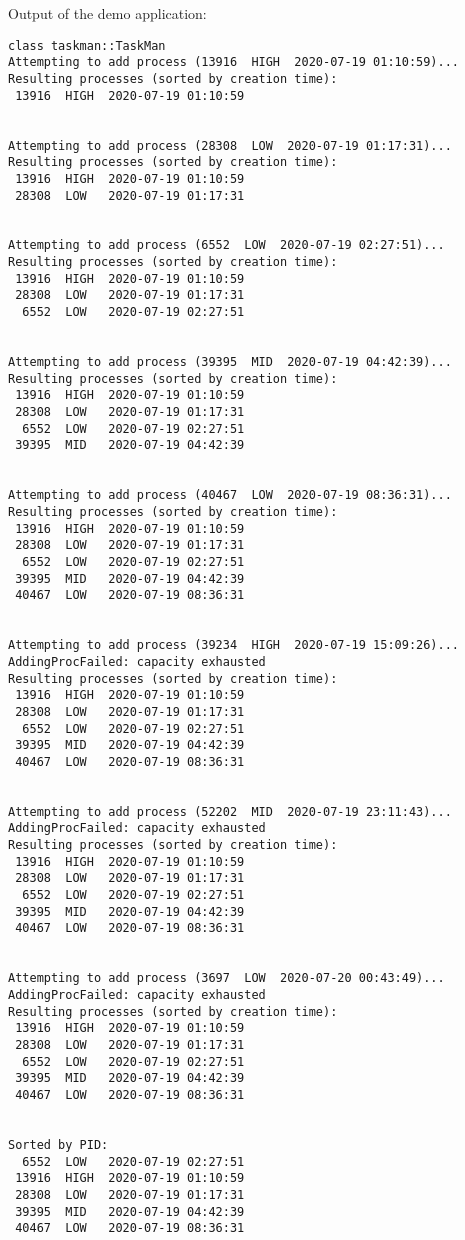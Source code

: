 \documentclass[a4paper]{scrartcl}
\begin{document}
Output of the demo application:
\begin{verbatim}
class taskman::TaskMan
Attempting to add process (13916  HIGH  2020-07-19 01:10:59)...
Resulting processes (sorted by creation time):
 13916  HIGH  2020-07-19 01:10:59


Attempting to add process (28308  LOW  2020-07-19 01:17:31)...
Resulting processes (sorted by creation time):
 13916  HIGH  2020-07-19 01:10:59
 28308  LOW   2020-07-19 01:17:31


Attempting to add process (6552  LOW  2020-07-19 02:27:51)...
Resulting processes (sorted by creation time):
 13916  HIGH  2020-07-19 01:10:59
 28308  LOW   2020-07-19 01:17:31
  6552  LOW   2020-07-19 02:27:51


Attempting to add process (39395  MID  2020-07-19 04:42:39)...
Resulting processes (sorted by creation time):
 13916  HIGH  2020-07-19 01:10:59
 28308  LOW   2020-07-19 01:17:31
  6552  LOW   2020-07-19 02:27:51
 39395  MID   2020-07-19 04:42:39


Attempting to add process (40467  LOW  2020-07-19 08:36:31)...
Resulting processes (sorted by creation time):
 13916  HIGH  2020-07-19 01:10:59
 28308  LOW   2020-07-19 01:17:31
  6552  LOW   2020-07-19 02:27:51
 39395  MID   2020-07-19 04:42:39
 40467  LOW   2020-07-19 08:36:31


Attempting to add process (39234  HIGH  2020-07-19 15:09:26)...
AddingProcFailed: capacity exhausted
Resulting processes (sorted by creation time):
 13916  HIGH  2020-07-19 01:10:59
 28308  LOW   2020-07-19 01:17:31
  6552  LOW   2020-07-19 02:27:51
 39395  MID   2020-07-19 04:42:39
 40467  LOW   2020-07-19 08:36:31


Attempting to add process (52202  MID  2020-07-19 23:11:43)...
AddingProcFailed: capacity exhausted
Resulting processes (sorted by creation time):
 13916  HIGH  2020-07-19 01:10:59
 28308  LOW   2020-07-19 01:17:31
  6552  LOW   2020-07-19 02:27:51
 39395  MID   2020-07-19 04:42:39
 40467  LOW   2020-07-19 08:36:31


Attempting to add process (3697  LOW  2020-07-20 00:43:49)...
AddingProcFailed: capacity exhausted
Resulting processes (sorted by creation time):
 13916  HIGH  2020-07-19 01:10:59
 28308  LOW   2020-07-19 01:17:31
  6552  LOW   2020-07-19 02:27:51
 39395  MID   2020-07-19 04:42:39
 40467  LOW   2020-07-19 08:36:31


Sorted by PID:
  6552  LOW   2020-07-19 02:27:51
 13916  HIGH  2020-07-19 01:10:59
 28308  LOW   2020-07-19 01:17:31
 39395  MID   2020-07-19 04:42:39
 40467  LOW   2020-07-19 08:36:31



\end{verbatim}
\end{document}
